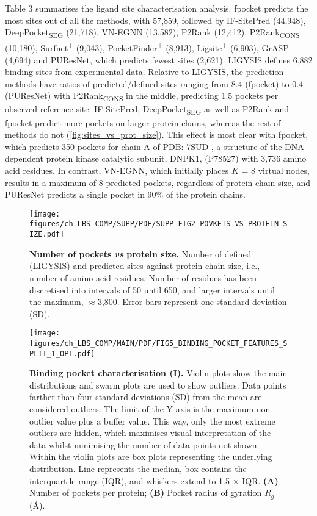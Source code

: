 Table 3 summarises the ligand site characterisation analysis. fpocket predicts the most sites out of all the methods, with 57,859, followed by IF-SitePred (44,948), DeepPocket\textsubscript{SEG} (21,718), VN-EGNN (13,582), P2Rank (12,412), P2Rank\textsubscript{CONS} (10,180), Surfnet\textsuperscript{+} (9,043), PocketFinder\textsuperscript{+} (8,913), Ligsite\textsuperscript{+} (6,903), GrASP (4,694) and PUResNet, which predicts fewest sites (2,621). LIGYSIS defines 6,882 binding sites from experimental data. Relative to LIGYSIS, the prediction methods have ratios of predicted/defined sites ranging from 8.4 (fpocket) to 0.4 (PUResNet) with P2Rank\textsubscript{CONS} in the middle, predicting 1.5 pockets per observed reference site. IF-SitePred, DeepPocket\textsubscript{SEG} as well as P2Rank and fpocket predict more pockets on larger protein chains, whereas the rest of methods do not (\autoref{fig:sites_vs_prot_size}). This effect is most clear with fpocket, which predicts 350 pockets for chain A of PDB: 7SUD \cite{LIU_2022_DNAPK}, a structure of the DNA-dependent protein kinase catalytic subunit, DNPK1, (P78527) with 3,736 amino acid residues. In contrast, VN-EGNN, which initially places $K$ = 8 virtual nodes, results in a maximum of 8 predicted pockets, regardless of protein chain size, and PUResNet predicts a single pocket in 90\% of the protein chains. 

\begin{figure}[ht!]
    \centering
    \texttt{[image: figures/ch\_LBS\_COMP/SUPP/PDF/SUPP\_FIG2\_POVKETS\_VS\_PROTEIN\_SIZE.pdf]}
    \caption[Number of pockets \textit{vs} protein size]{\textbf{Number of pockets \textit{vs} protein size.} Number of defined (LIGYSIS) and predicted sites against protein chain size, i.e., number of amino acid residues. Number of residues has been discretised into intervals of 50 until 650, and larger intervals until the maximum, $\approx$3,800. Error bars represent one standard deviation (SD).}
    \label{fig:sites_vs_prot_size}
\end{figure}

\begin{figure}[ht!]
    \centering
    \texttt{[image: figures/ch\_LBS\_COMP/MAIN/PDF/FIG5\_BINDING\_POCKET\_FEATURES\_SPLIT\_1\_OPT.pdf]}
    \caption[Binding pocket characterisation (I)]{\textbf{Binding pocket characterisation (I).} Violin plots show the main distributions and swarm plots are used to show outliers. Data points farther than four standard deviations (SD) from the mean are considered outliers. The limit of the Y axis is the maximum non-outlier value plus a buffer value. This way, only the most extreme outliers are hidden, which maximises visual interpretation of the data whilst minimising the number of data points not shown. Within the violin plots are box plots representing the underlying distribution. Line represents the median, box contains the interquartile range (IQR), and whiskers extend to 1.5 $\times$ IQR. \textbf{(A)} Number of pockets per protein; \textbf{(B)} Pocket radius of gyration $R_{g}$ (\AA{}).}
    \label{fig:pocket_features_1}
\end{figure}


